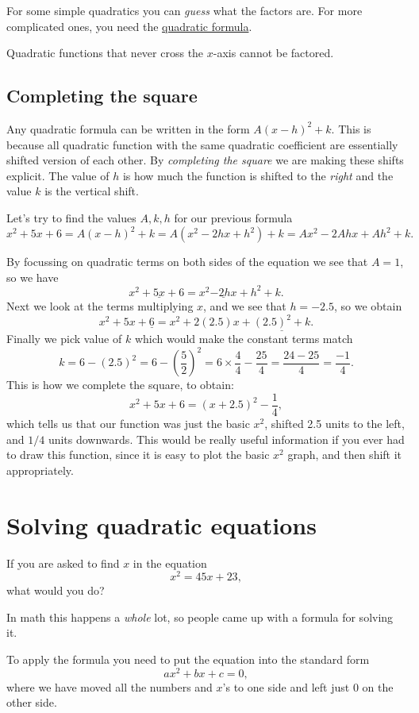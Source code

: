 \documentclass[twocolumn,8pt]{extarticle}
\newcommand{\dokutitleleveltwo}[1]{\section{#1}}
\newcommand{\dokutitleleveltree}[1]{\subsection{#1}}
\newcommand{\dokuitalic}[1]{\textsl{#1}}
\begin{document}
For some simple quadratics you can \dokuitalic{guess} what the factors are.
For more complicated ones, you need the \hyperref[470dad9cac00a9924004d164cb491a31]{quadratic formula}.

Quadratic functions that never cross the \(x\)-axis cannot be factored.


\dokutitleleveltree{Completing the square}
\label{b94fc77efd4263b48096cc83d6dee58b}%

Any quadratic formula can be written in the form \(A(x-h)^2+k\).
This is because all quadratic function with the same quadratic coefficient 
are essentially shifted version of each other. 
By \dokuitalic{completing the square} we are making these shifts explicit. 
The value of \(h\) is how much the function is shifted to the \dokuitalic{right} and
the value \(k\) is the vertical shift.

Let's try to find the values \(A,k,h\) for our previous formula
\[
  x^2+5x+6  =   A(x-h)^2+k = A(x^2-2hx + h^2) + k = Ax^2 - 2Ahx + Ah^2 + k.
\]

By focussing on quadratic terms on both sides of the equation
we see that \(A=1\), so we have
\[
  x^2+\underline{5x}+6 =  x^2  \underline{-2hx} + h^2 + k.
\]
Next we look at the terms multiplying \(x\), and we see that \(h=-2.5\),
so we obtain
\[
  x^2+5x+\underline{6} =  x^2+ 2(2.5)x + \underline{(2.5)^2 + k}.
\]
Finally we pick value of \(k\) which would make the constant terms match
\[
 k = 6 - (2.5)^2 = 6 - \left(\frac{5}{2}\right)^2 = 6 \times \frac{4}{4} - \frac{25}{4} = \frac{24 - 25}{4} = \frac{-1}{4}.
\]
This is how we complete the square, to obtain:
\[
  x^2+5x+6  = (x+2.5)^2 - \frac{1}{4},
\]
which tells us that our function was just the basic \(x^2\), shifted 2.5 units to the left, and \(1/4\) units downwards.
This would be really useful information if you ever had to draw this function, since it is easy to plot the basic \(x^2\) graph, and then shift
it appropriately.




\dokutitleleveltwo{Solving quadratic equations}
\label{194a7a851bde33e69ef4857d4aec9049}%

If you are asked to find \(x\) in the equation 
\[
  x^2 = 45x + 23,
\]
what would you do?

In math this happens a \dokuitalic{whole} lot, so people came up with a 
formula for solving it.

To apply the formula you need to put the equation into the
standard form
\[
  ax^2 + bx + c = 0,
\]
where we have moved all the numbers and \(x\)'s to one side and left 
just \(0\) on the other side.
\end{document}
